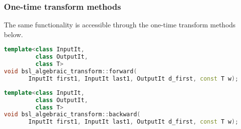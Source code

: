 
\subsubsection*{One-time transform methods}
The same functionality is accessible through the one-time transform methods
below.

\begin{lstlisting}[language=C++,caption=Forward algebraic transform.]
template<class InputIt,
         class OutputIt,
         class T>
void bsl_algebraic_transform::forward(
       InputIt first1, InputIt last1, OutputIt d_first, const T w);
\end{lstlisting}
\begin{lstlisting}[language=C++,caption=Backward algebraic transform.]
template<class InputIt,
         class OutputIt,
         class T>
void bsl_algebraic_transform::backward(
       InputIt first1, InputIt last1, OutputIt d_first, const T w);
\end{lstlisting}

